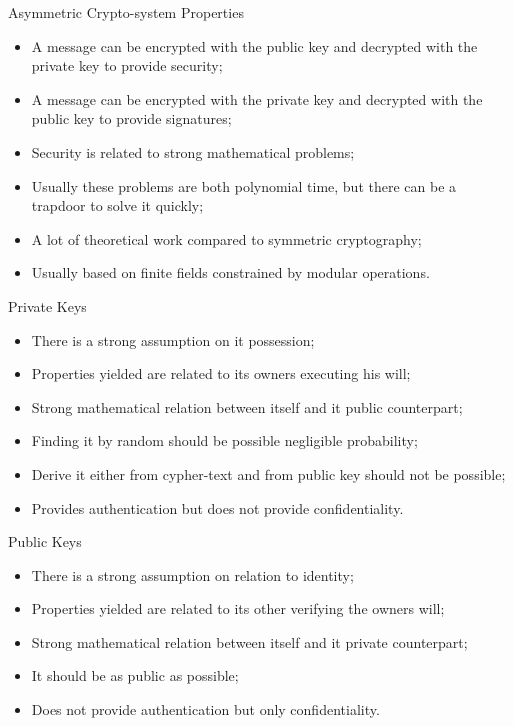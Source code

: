 \documentclass[12pt,table,xcolor={dvipsnames}]{beamer}
\begin{document}
\begin{frame}{Asymmetric Crypto-system Properties}
\begin{itemize}
\item A message can be encrypted with the public key and decrypted with the private key to provide security;\pause
\item A message can be encrypted with the private key and decrypted with the public key to provide signatures;\pause
\item Security is related to strong mathematical problems;\pause
\item Usually these problems are both polynomial time, but there can be a trapdoor to solve it quickly;\pause
\item A lot of theoretical work compared to symmetric cryptography;\pause
\item Usually based on finite fields constrained by modular operations.\pause
\end{itemize}
\end{frame}

\begin{frame}{Private Keys}
\begin{itemize}
\item There is a strong assumption on it possession;\pause
\item Properties yielded are related to its owners executing his will;\pause
\item Strong mathematical relation between itself and it public counterpart;\pause
\item Finding it by random should be possible negligible probability;\pause
\item Derive it either from cypher-text and from public key should not be possible;\pause
\item Provides authentication but does not provide confidentiality.
\end{itemize}
\end{frame}

\begin{frame}{Public Keys}
\begin{itemize}
\item There is a strong assumption on relation to identity;\pause
\item Properties yielded are related to its other verifying the owners will;\pause
\item Strong mathematical relation between itself and it private counterpart;\pause
\item It should be as public as possible;\pause
\item Does not provide authentication but only confidentiality.
\end{itemize}
\end{frame}
\end{document}
